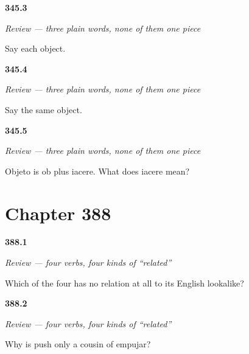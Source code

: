 \noindent\begin{minipage}[t]{\linewidth}
\raggedright
\hypertarget{review-ES-C345-repaso-cada-mismo-objeto-cada}{\textbf{345.3}} \emph{Review — three plain words, none of them one piece}\par
\small Say each object.
\end{minipage}\par\medskip

\noindent\begin{minipage}[t]{\linewidth}
\raggedright
\hypertarget{review-ES-C345-repaso-cada-mismo-objeto-mismo}{\textbf{345.4}} \emph{Review — three plain words, none of them one piece}\par
\small Say the same object.
\end{minipage}\par\medskip

\noindent\begin{minipage}[t]{\linewidth}
\raggedright
\hypertarget{review-ES-C345-repaso-cada-mismo-objeto-partes}{\textbf{345.5}} \emph{Review — three plain words, none of them one piece}\par
\small Objeto is ob plus iacere. What does iacere mean?
\end{minipage}\par\medskip

\section*{Chapter 388}

\noindent\begin{minipage}[t]{\linewidth}
\raggedright
\hypertarget{review-ES-C388-repaso-cuatro-hedges-norelation}{\textbf{388.1}} \emph{Review — four verbs, four kinds of \textquotedblleft{}related\textquotedblright{}}\par
\small Which of the four has no relation at all to its English lookalike?
\end{minipage}\par\medskip

\noindent\begin{minipage}[t]{\linewidth}
\raggedright
\hypertarget{review-ES-C388-repaso-cuatro-hedges-cousin}{\textbf{388.2}} \emph{Review — four verbs, four kinds of \textquotedblleft{}related\textquotedblright{}}\par
\small Why is push only a cousin of empujar?
\end{minipage}\par\medskip

